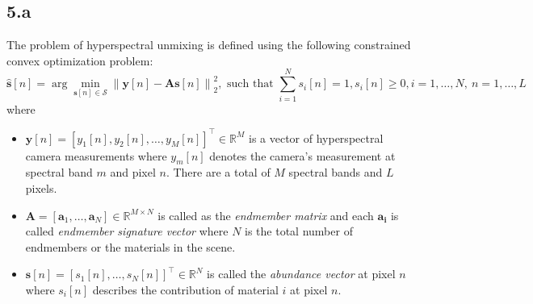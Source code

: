 \documentclass[12pt]{article}
\newcommand{\norm}[1]{\left\lVert #1 \right\rVert}
\begin{document}
\subsection*{5.a}
The problem of hyperspectral unmixing is defined using the following constrained convex optimization problem:
$$\hat{\boldsymbol{s}}[n] = \arg \min \limits_{\boldsymbol{s}[n] \in \mathcal{S}} \norm{\boldsymbol{y}[n] - \boldsymbol{A} \boldsymbol{s}[n]}_2^2, \text{ such that } \sum \limits_{i=1}^N s_i[n] = 1, s_i[n] \geq 0, i=1, \ldots, N,\: n=1, \ldots ,L$$
where 
\begin{itemize}
	\item $\boldsymbol{y}[n] = [y_1[n], y_2[n], \ldots, y_M[n]]^\intercal \in \mathbb{R}^M$ is a vector of hyperspectral camera measurements where $y_m[n]$ denotes the camera's measurement at spectral band $m$ and pixel $n$. There are a total of $M$ spectral bands and $L$ pixels.
	\item $\boldsymbol{A} = [\boldsymbol{a}_1, \ldots, \boldsymbol{a}_N] \in \mathbb{R}^{M \times N}$ is called as the \textit{endmember matrix} and each $\boldsymbol{a_i}$ is called \textit{endmember signature vector} where $N$ is the total number of endmembers or the materials in the scene.
	\item $\boldsymbol{s}[n] = [s_1[n], \ldots,s_N[n]]^\intercal \in \mathbb{R}^N$ is called the \textit{abundance vector} at pixel $n$ where $s_i[n]$ describes the contribution of material $i$ at pixel $n$.
\end{itemize}
\end{document}
